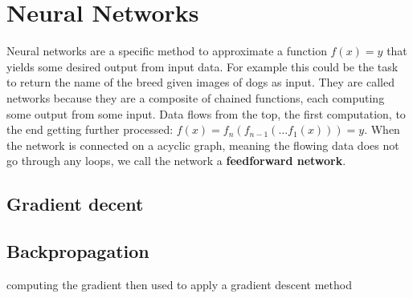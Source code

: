 \section{Neural Networks}
\label{sec:concepts:nn}
Neural networks are a specific method to approximate a function $f(x) = y$ that yields some desired output from input data. For example this could be the task to return the name of the breed given images of dogs as input. They are called networks because they are a composite of chained functions, each computing some output from some input. Data flows from the top, the first computation, to the end getting further processed: $f(x) = f_n(f_{n-1}(\dots f_1(x))) = y$. When the network is connected on a acyclic graph, meaning the flowing data does not go through any loops, we call the network a \textbf{feedforward network}.

\subsection{Gradient decent}
\label{sub:concepts:nn:gd}

\subsection{Backpropagation}
\label{sub:concepts:nn:backprob}
\citet{rumelhart_learning_1988}
computing the gradient then used to apply a gradient descent method

